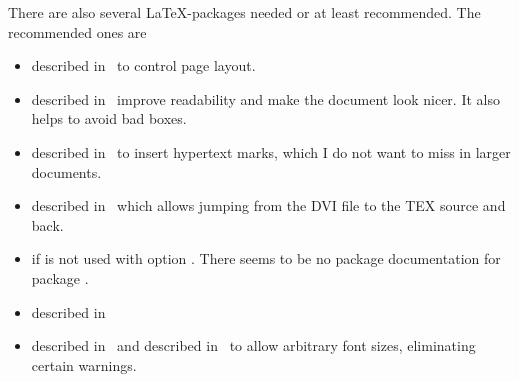 There are also several \LaTeX-packages needed or at least recommended. 
The recommended ones are 
%
\begin{itemize}
\item
{} described in~\cite{GeomP} 
to control page layout. 
\item
{} described in~\cite{MicroTyP} improve readability 
and make the document look nicer. 
It also helps to avoid bad boxes. 
\item
{} described in~\cite{HyperTextP} 
to insert hypertext marks, which I do not want to miss in larger documents. 
\item
{} described in~\cite{SrcLtxP} 
which allows jumping from the DVI file to the TEX source and back.
\item
{} 
if  is not used with option . 
There seems to be no package documentation for package . 
\item
{} described in~\cite{BooktP} 

\item
{} described in~\cite{FixCmP} and 
 described in~\cite{AnyfontsizeP} 
to allow arbitrary font sizes, eliminating certain warnings. 
\end{itemize}


